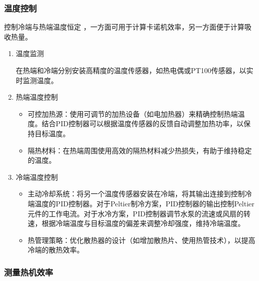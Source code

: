 \documentclass[dvipsnames, svgnames,a4paper,11pt]{article}
\begin{document}
	\subsubsection{温度控制}
	
	控制冷端与热端温度恒定 ，一方面可用于计算卡诺机效率，另一方面便于计算吸收热量。
	
	\begin{enumerate}
		\item 温度监测
		
		在热端和冷端分别安装高精度的温度传感器，如热电偶或PT100传感器，以实时监测温度。
		
		\item 热端温度控制
		\begin{itemize}
			\item 可控加热源：使用可调节的加热设备（如电加热器）来精确控制热端温度。结合PID控制器可以根据温度传感器的反馈自动调整加热功率，以保持目标温度。
			\item 隔热材料：在热端周围使用高效的隔热材料减少热损失，有助于维持稳定的温度。
		\end{itemize}
		
		\item 冷端温度控制
		\begin{itemize}
			\item 主动冷却系统：将另一个温度传感器安装在冷端，将其输出连接到控制冷端温度的PID控制器。对于Peltier制冷方案，PID控制器的输出控制Peltier元件的工作电流。对于水冷方案，PID控制器调节水泵的流速或风扇的转速，根据冷端温度与目标温度的偏差来调整冷却强度，维持冷端温度。
			
			\item 热管理策略：优化散热器的设计（如增加散热片、使用热管技术），以提高冷端的散热效率。
		\end{itemize}
		
	\end{enumerate}
	
	\subsubsection{测量热机效率}
	
\end{document}
